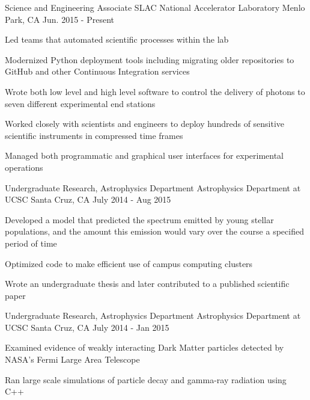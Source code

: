\begin{cventries}
  \cventry
    {Science and Engineering Associate}
    {SLAC National Accelerator Laboratory}
    {Menlo Park, CA}
    {Jun. 2015 - Present}
    {
      \begin{cvitems}
        \item {Led teams that automated scientific processes within the lab}
        \item {Modernized Python deployment tools including migrating older
               repositories to GitHub and other Continuous Integration
               services}
        \item {Wrote both low level and high level software to control the
               delivery of photons to seven different experimental end stations}
        \item {Worked closely with scientists and engineers to deploy hundreds
               of sensitive scientific instruments in compressed time frames}
        \item {Managed both programmatic and graphical user interfaces for
               experimental operations} 
    \end{cvitems}
    }
  \cventry
    {Undergraduate Research, Astrophysics Department}
    {Astrophysics Department at UCSC}
    {Santa Cruz, CA}
    {July 2014 - Aug 2015}
    {
      \begin{cvitems}
        \item {Developed a model that predicted the spectrum emitted by young
               stellar populations, and the amount this emission would vary
               over the course a specified period of time}
        \item {Optimized code to make efficient use of campus computing
               clusters}
        \item {Wrote an undergraduate thesis and later contributed to a
               published scientific paper}
      \end{cvitems}
      }
  \cventry
    {Undergraduate Research, Astrophysics Department}
    {Astrophysics Department at UCSC}
    {Santa Cruz, CA}
    {July 2014 - Jan 2015}
    {
      \begin{cvitems}
        \item {Examined evidence of weakly interacting Dark Matter particles
               detected by NASA's Fermi Large Area Telescope}
        \item {Ran large scale simulations of particle decay and gamma-ray
               radiation using C++}
      \end{cvitems}
      }
\end{cventries}
